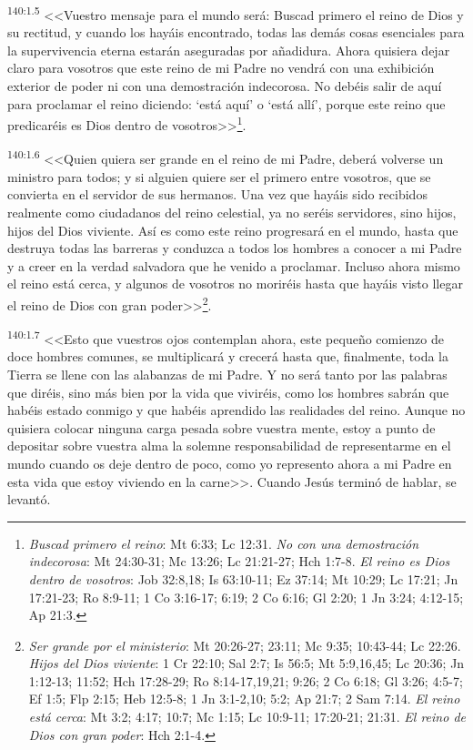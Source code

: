 \par 
\textsuperscript{140:1.5} <<Vuestro mensaje para el mundo será: Buscad primero el reino de Dios y su rectitud, y cuando los hayáis encontrado, todas las demás cosas esenciales para la supervivencia eterna estarán aseguradas por añadidura. Ahora quisiera dejar claro para vosotros que este reino de mi Padre no vendrá con una exhibición exterior de poder ni con una demostración indecorosa. No debéis salir de aquí para proclamar el reino diciendo: `está aquí' o `está allí', porque este reino que predicaréis es Dios dentro de vosotros>>\footnote{\textit{Buscad primero el reino}: Mt 6:33; Lc 12:31. \textit{No con una demostración indecorosa}: Mt 24:30-31; Mc 13:26; Lc 21:21-27; Hch 1:7-8. \textit{El reino es Dios dentro de vosotros}: Job 32:8,18; Is 63:10-11; Ez 37:14; Mt 10:29; Lc 17:21; Jn 17:21-23; Ro 8:9-11; 1 Co 3:16-17; 6:19; 2 Co 6:16; Gl 2:20; 1 Jn 3:24; 4:12-15; Ap 21:3.}.

\par 
\textsuperscript{140:1.6} <<Quien quiera ser grande en el reino de mi Padre, deberá volverse un ministro para todos; y si alguien quiere ser el primero entre vosotros, que se convierta en el servidor de sus hermanos. Una vez que hayáis sido recibidos realmente como ciudadanos del reino celestial, ya no seréis servidores, sino hijos, hijos del Dios viviente. Así es como este reino progresará en el mundo, hasta que destruya todas las barreras y conduzca a todos los hombres a conocer a mi Padre y a creer en la verdad salvadora que he venido a proclamar. Incluso ahora mismo el reino está cerca, y algunos de vosotros no moriréis hasta que hayáis visto llegar el reino de Dios con gran poder>>\footnote{\textit{Ser grande por el ministerio}: Mt 20:26-27; 23:11; Mc 9:35; 10:43-44; Lc 22:26. \textit{Hijos del Dios viviente}: 1 Cr 22:10; Sal 2:7; Is 56:5; Mt 5:9,16,45; Lc 20:36; Jn 1:12-13; 11:52; Hch 17:28-29; Ro 8:14-17,19,21; 9:26; 2 Co 6:18; Gl 3:26; 4:5-7; Ef 1:5; Flp 2:15; Heb 12:5-8; 1 Jn 3:1-2,10; 5:2; Ap 21:7; 2 Sam 7:14. \textit{El reino está cerca}: Mt 3:2; 4:17; 10:7; Mc 1:15; Lc 10:9-11; 17:20-21; 21:31. \textit{El reino de Dios con gran poder}: Hch 2:1-4.}.

\par 
\textsuperscript{140:1.7} <<Esto que vuestros ojos contemplan ahora, este pequeño comienzo de doce hombres comunes, se multiplicará y crecerá hasta que, finalmente, toda la Tierra se llene con las alabanzas de mi Padre. Y no será tanto por las palabras que diréis, sino más bien por la vida que viviréis, como los hombres sabrán que habéis estado conmigo y que habéis aprendido las realidades del reino. Aunque no quisiera colocar ninguna carga pesada sobre vuestra mente, estoy a punto de depositar sobre vuestra alma la solemne responsabilidad de representarme en el mundo cuando os deje dentro de poco, como yo represento ahora a mi Padre en esta vida que estoy viviendo en la carne>>. Cuando Jesús terminó de hablar, se levantó.

